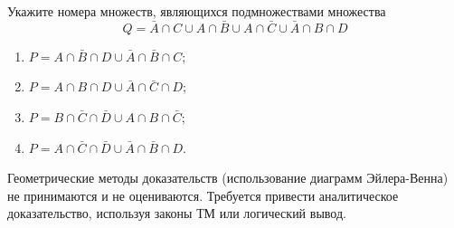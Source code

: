 \question
Укажите номера множеств, являющихся подмножествами множества
\begin{equation*}
	Q = \bar{A} \cap C \cup A \cap \bar{B} \cup A \cap \bar{C} \cup \bar{A} \cap B \cap D
\end{equation*}

\begin{enumerate}
	\renewcommand{\labelenumi}{\arabic{enumi})}
	\item $P = A \cap \bar{B} \cap D \cup \bar{A} \cap \bar{B} \cap C$;
	\item $P = A \cap B \cap D \cup \bar{A} \cap \bar{C} \cap D$;
	\item $P = B \cap \bar{C} \cap \bar{D} \cup A \cap B \cap \bar{C}$;
	\item $P = A \cap \bar{C} \cap \bar{D} \cup \bar{A} \cap \bar{B} \cap D$.
\end{enumerate}

Геометрические методы доказательств (использование диаграмм Эйлера-Венна) не принимаются и не оцениваются. Требуется привести аналитическое доказательство, используя законы ТМ или логический вывод.
